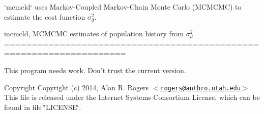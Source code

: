 `mcmcld` uses \-Markov-\/\-Coupled \-Markov-\/\-Chain \-Monte \-Carlo (\-M\-C\-M\-C\-M\-C) to estimate the cost function $\sigma_d^2$.

mcmcld, \-M\-C\-M\-C\-M\-C estimates of population history from $\sigma_d^2$ ====================================================================

\-This program needs work. \-Don't trust the current version.

\begin{DoxyCopyright}{\-Copyright}
\-Copyright (c) 2014, \-Alan \-R. \-Rogers $<$\href{mailto:rogers@anthro.utah.edu}{\tt rogers@anthro.\-utah.\-edu}$>$. \-This file is released under the \-Internet \-Systems \-Consortium \-License, which can be found in file \char`\"{}\-L\-I\-C\-E\-N\-S\-E\char`\"{}. 
\end{DoxyCopyright}
